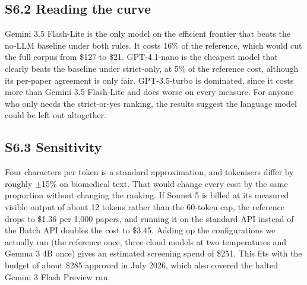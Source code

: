 \documentclass[11pt,a4paper]{article}
\begin{document}
\subsection{S6.2  Reading the curve}
Gemini 3.5 Flash-Lite is the only model on the efficient frontier that beats the no-LLM baseline under both rules. It costs 16\% of the reference, which would cut the full corpus from \$127 to \$21. GPT-4.1-nano is the cheapest model that clearly beats the baseline under strict-only, at 5\% of the reference cost, although its per-paper agreement is only fair. GPT-3.5-turbo is dominated, since it costs more than Gemini 3.5 Flash-Lite and does worse on every measure. For anyone who only needs the strict-or-yes ranking, the results suggest the language model could be left out altogether.

\subsection{S6.3  Sensitivity}
Four characters per token is a standard approximation, and tokenisers differ by roughly $\pm$15\% on biomedical text. That would change every cost by the same proportion without changing the ranking. If Sonnet 5 is billed at its measured visible output of about 12 tokens rather than the 60-token cap, the reference drops to \$1.36 per 1,000 papers, and running it on the standard API instead of the Batch API doubles the cost to \$3.45. Adding up the configurations we actually ran (the reference once, three cloud models at two temperatures and Gemma 3 4B once) gives an estimated screening spend of \$251. This fits with the budget of about \$285 approved in July 2026, which also covered the halted Gemini 3 Flash Preview run.
\end{document}
